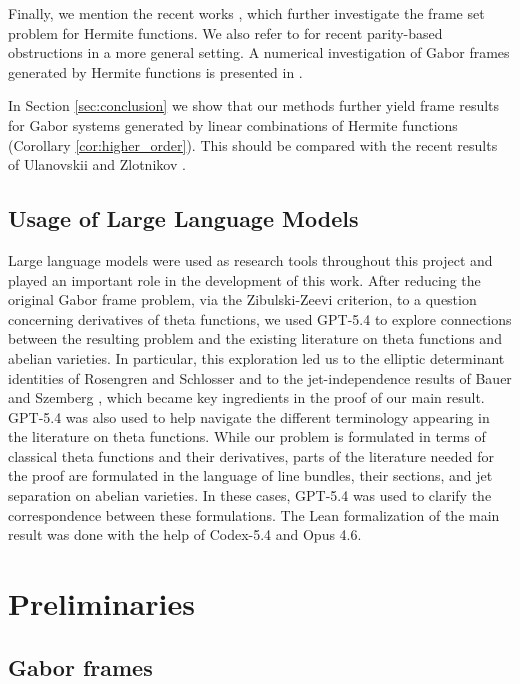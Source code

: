 \documentclass[reqno,a4paper,12pt]{amsart}
\numberwithin{equation}{section}
\begin{document}
Finally, we mention the recent works \cite{FaulhuberEtAl2025,FaulhuberShafkulovskaZlotnikov_part2,Faulhuber2026wirtinger}, which further investigate the frame set problem for Hermite functions. We also refer to \cite{UlanovskiiZlotnikov2026} for recent parity-based obstructions in a more general setting. A numerical investigation of Gabor frames generated by Hermite functions is presented in \cite{GhoshSelvan2025}.

In Section \ref{sec:conclusion} we show that our methods further yield frame results for Gabor systems generated by linear combinations of Hermite functions (Corollary \ref{cor:higher_order}). This should be compared with the recent results of Ulanovskii and Zlotnikov \cite{UlanovskiiZlotnikov2026}.


\subsection*{Usage of Large Language Models}
Large language models were used as research tools throughout this project and played an important role in the development of this work. After reducing the original Gabor frame problem, via the Zibulski-Zeevi criterion, to a question concerning derivatives of theta functions, we used GPT-5.4 to explore connections between the resulting problem and the existing literature on theta functions and abelian varieties. In particular, this exploration led us to the elliptic determinant identities of Rosengren and Schlosser \cite{RosengrenSchlosser2006} and to the jet-independence results of Bauer and Szemberg \cite{BauerSzemberg1997}, which became key ingredients in the proof of our main result. GPT-5.4 was also used to help navigate the different terminology appearing in the literature on theta functions. While our problem is formulated in terms of classical theta functions and their derivatives, parts of the literature needed for the proof are formulated in the language of line bundles, their sections, and jet separation on abelian varieties. In these cases, GPT-5.4 was used to clarify the correspondence between these formulations. The Lean formalization of the main result was done with the help of Codex-5.4 and Opus 4.6.

\section{Preliminaries}

\subsection{Gabor frames}
\end{document}
